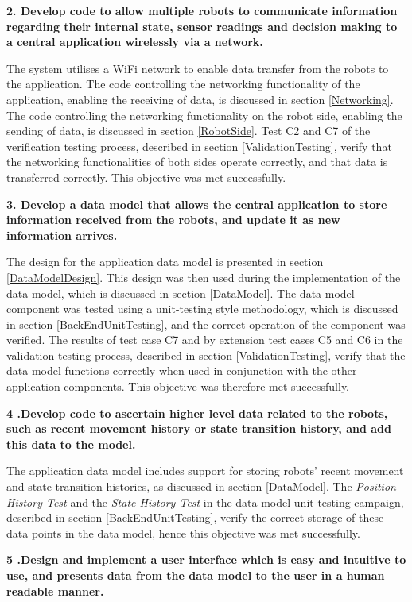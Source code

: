 \noindent \textbf{2. Develop code to allow multiple robots to communicate information regarding their internal state, sensor readings and decision making to a central application wirelessly via a network.}

The system utilises a WiFi network to enable data transfer from the robots to the application. The code controlling the networking functionality of the application, enabling the receiving of data, is discussed in section \ref{Networking}. The code controlling the networking functionality on the robot side, enabling the sending of data, is discussed in section \ref{RobotSide}. Test C2 and C7 of the verification testing process, described in section \ref{ValidationTesting}, verify that the networking functionalities of both sides operate correctly, and that data is transferred correctly. This objective was met successfully.

\noindent \textbf{3. Develop a data model that allows the central application to store information received from the robots, and update it as new information arrives.}

The design for the application data model is presented in section \ref{DataModelDesign}. This design was then used during the implementation of the data model, which is discussed in section \ref{DataModel}. The data model component was tested using a unit-testing style methodology, which is discussed in section \ref{BackEndUnitTesting}, and the correct operation of the component was verified. The results of test case C7 and by extension test cases C5 and C6 in the validation testing process, described in section \ref{ValidationTesting}, verify that the data model functions correctly when used in conjunction with the other application components. This objective was therefore met successfully.

\noindent \textbf{4 .Develop code to ascertain higher level data related to the robots, such as recent movement history or state transition history, and add this data to the model.}

The application data model includes support for storing robots' recent movement and state transition histories, as discussed in section \ref{DataModel}. The \textit{Position History Test} and the \textit{State History Test} in the data model unit testing campaign, described in section \ref{BackEndUnitTesting}, verify the correct storage of these data points in the data model, hence this objective was met successfully.

\noindent \textbf{5 .Design and implement a user interface which is easy and intuitive to use, and presents data from the data model to the user in a human readable manner.}

